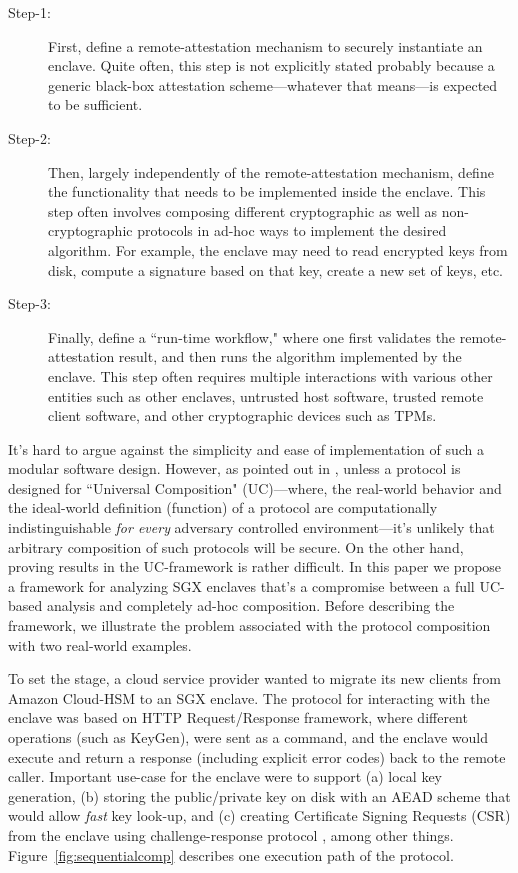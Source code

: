 \documentclass[letterpaper]{article}
\newcommand{\uc}{\textsf{UC}}
\begin{document}
  \begin{description}
    \item[Step-1:] First, define a remote-attestation mechanism to
      securely instantiate an enclave. Quite often, this step is not
      explicitly stated probably because a generic black-box
      attestation scheme---whatever that means---is expected to be
      sufficient.
    \item[Step-2:] Then, largely independently of the
      remote-attestation mechanism, define the functionality that
      needs to be implemented inside the enclave. This step often
      involves composing different cryptographic as well as
      non-cryptographic protocols in ad-hoc ways to implement the
      desired algorithm. For example, the enclave may need to read
      encrypted keys from disk, compute a signature based on that key,
      create a new set of keys, etc.
    \item[Step-3:] Finally, define a ``run-time workflow," where one
      first validates the remote-attestation result, and then runs the
      algorithm implemented by the enclave. This step often requires
      multiple interactions with various other entities such as other
      enclaves, untrusted host software, trusted remote client
      software, and other cryptographic devices such as TPMs.
  \end{description}

  It's hard to argue against the simplicity and ease of implementation
  of such a modular software design. However, as pointed out in
  \cite{ucframework, cramerthesis}, unless a protocol is designed for
  ``\textsf{Universal Composition}" (\uc)---where, the real-world
  behavior and the ideal-world definition (function) of a protocol are
  computationally indistinguishable \textit{for every} adversary
  controlled environment---it's unlikely that arbitrary composition of
  such protocols will be secure. On the other hand, proving results in
  the \uc-framework is rather difficult. In this paper we propose a
  framework for analyzing SGX enclaves that's a compromise between a
  full \uc-based analysis and completely ad-hoc composition. Before
  describing the framework, we illustrate the problem associated with
  the protocol composition with two real-world examples.

  To set the stage, a cloud service provider wanted to migrate its new
  clients from Amazon Cloud-HSM to an SGX enclave. The protocol for
  interacting with the enclave was based on HTTP Request/Response
  framework, where different operations (such as \textsf{KeyGen}),
  were sent as a command, and the enclave would execute and return a
  response (including explicit error codes) back to the remote caller.
  Important use-case for the enclave were to support (a) local key
  generation, (b) storing the public/private key on disk with an AEAD
  scheme that would allow \textit{fast} key look-up, and (c) creating
  Certificate Signing Requests (CSR) from the enclave using
  challenge-response protocol \cite[\S5.2.8.3]{rfc4210}, among other
  things. Figure~\ref{fig:sequentialcomp} describes one execution path
  of the protocol.
\end{document}
